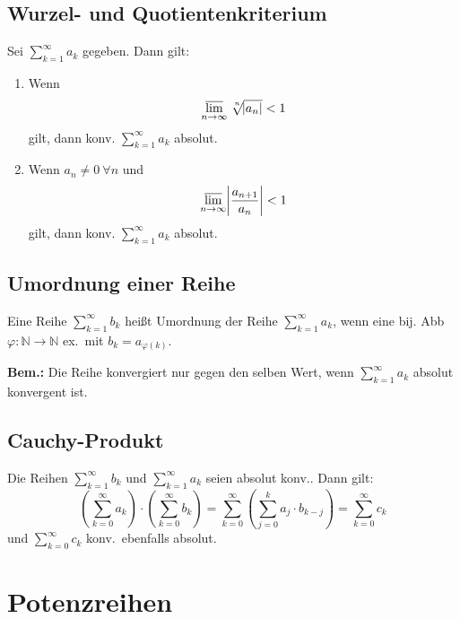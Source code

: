 \documentclass[10pt]{article}
\newcommand{\N}{\mathbb{N}}
\newcommand*{\nthSqrt}[2]{\sqrt[\leftroot{-2}\uproot{2}#1]{#2}}
\begin{document}
    \subsection{Wurzel- und Quotientenkriterium}
    Sei $\sum_{k=1}^\infty a_k$ gegeben. Dann gilt:
    \begin{enumerate}[label= (\alph*)]
        \item Wenn
            \begin{equation*}
                \varlimsup_{n \rightarrow \infty}
                \nthSqrt{n}{\abs{a_n}} < 1
            \end{equation*}
            gilt, dann konv. $\sum_{k=1}^\infty a_k$ absolut.
        \item Wenn $a_n \neq 0\ \forall n$ und
            \begin{equation*}
                \varlimsup_{n \rightarrow \infty}
                \abs{\frac{a_{n+1}}{a_n}} < 1
            \end{equation*}
            gilt, dann konv. $\sum_{k=1}^\infty a_k$ absolut.
    \end{enumerate}

    \subsection{Umordnung einer Reihe}
    Eine Reihe $\sum_{k=1}^\infty b_k$ heißt Umordnung der Reihe
    $\sum_{k=1}^\infty a_k$,
    wenn eine bij. Abb $\varphi: \N \rightarrow \N$ ex.\ mit $b_k = a_{\varphi(k)}$.

    \textbf{Bem.:}
    Die Reihe konvergiert nur gegen den selben Wert, wenn $\sum_{k=1}^\infty a_k$
    absolut konvergent ist.

    \subsection{Cauchy-Produkt}
    Die Reihen  $\sum_{k=1}^\infty b_k$ und $\sum_{k=1}^\infty a_k$ seien absolut
    konv.. Dann gilt:
    \begin{equation*}
        \left(\sum_{k=0}^\infty a_k\right) \cdot \left(\sum_{k=0}^\infty b_k\right) =
        \sum_{k=0}^\infty \left(\sum_{j=0}^k a_j \cdot b_{k-j}\right) =
        \sum_{k=0}^\infty c_k
    \end{equation*}
    und $\sum_{k=0}^\infty c_k$ konv.\ ebenfalls absolut.

    \section{Potenzreihen}
\end{document}
